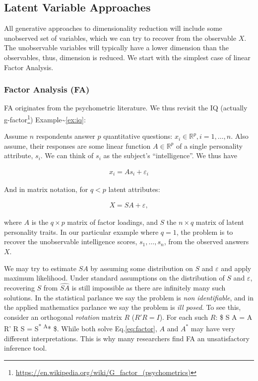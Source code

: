 \documentclass[]{book}
\theoremstyle{definition}
\theoremstyle{definition}
\theoremstyle{remark}
\let\BeginKnitrBlock\begin \let\EndKnitrBlock\end
\begin{document}
\subsection{Latent Variable
Approaches}\label{latent-variable-approaches}

All generative approaches to dimensionality reduction will include some
unobserved set of variables, which we can try to recover from the
observable \(X\). The unobservable variables will typically have a lower
dimension than the observables, thus, dimension is reduced. We start
with the simplest case of linear Factor Analysis.

\subsubsection{Factor Analysis (FA)}\label{factor-analysis-fa}

FA originates from the psychometric literature. We thus revisit the IQ
(actually g-factor\footnote{\url{https://en.wikipedia.org/wiki/G_factor_(psychometrics)}})
Example\textasciitilde{}\ref{ex:iq}:

\BeginKnitrBlock{example}
\protect\hypertarget{ex:unnamed-chunk-163}{}{\label{ex:unnamed-chunk-163}}Assume
\(n\) respondents answer \(p\) quantitative questions:
\(x_i \in \mathbb{R}^p, i=1,\dots,n\). Also assume, their responses are
some linear function \(A \in \mathbb{R}^p\) of a single personality
attribute, \(s_i\). We can think of \(s_i\) as the subject's
``intelligence''. We thus have

\begin{align}
    x_i = A s_i + \varepsilon_i
\end{align}

And in matrix notation, for \(q<p\) latent attributes:

\begin{align}
    X = S A+\varepsilon,
    \label{eq:factor}
\end{align}

where \(A\) is the \(q \times p\) matrix of factor loadings, and \(S\)
the \(n \times q\) matrix of latent personality traits. In our
particular example where \(q=1\), the problem is to recover the
unobservable intelligence scores, \(s_1,\dots,s_n\), from the observed
answers \(X\).
\EndKnitrBlock{example}

We may try to estimate \(S A\) by assuming some distribution on \(S\)
and \(\varepsilon\) and apply maximum likelihood. Under standard
assumptions on the distribution of \(S\) and \(\varepsilon\), recovering
\(S\) from \(\widehat{S A }\) is still impossible as there are
infinitely many such solutions. In the statistical parlance we say the
problem is \emph{non identifiable}, and in the applied mathematics
parlance we say the problem is \emph{ill posed}. To see this, consider
an orthogonal \emph{rotation} matrix \(R\) (\(R' R=I\)). For each such
\(R\): \$ S A = A R' R S = S\textsuperscript{* A}* \$. While both solve
Eq.\eqref{eq:factor}, \(A\) and \(A^*\) may have very different
interpretations. This is why many researchers find FA an unsatisfactory
inference tool.
\end{document}
